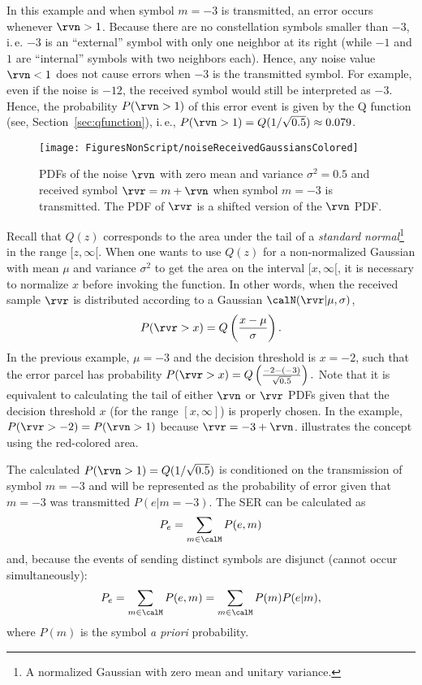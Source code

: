 In this example and when symbol $m=-3$ is transmitted, an error occurs whenever $\rvn > 1$. Because there are no constellation symbols smaller than $-3$, i.\,e. $-3$ is an ``external'' symbol with only one neighbor at its right (while $-1$ and $1$ are ``internal'' symbols with two neighbors each). Hence, any noise value $\rvn < 1$ does not cause errors when $-3$ is the transmitted symbol. For example, even if the noise is $-12$, the received symbol would still be interpreted as $-3$. Hence, the probability $P(\rvn > 1)$ of this error event is given by the Q function (see, Section~\ref{sec:qfunction}), i.\,e., $P(\rvn > 1)=Q(1/\sqrt{0.5})\approx 0.079$. 

\begin{figure}[htbp]
\centering
\texttt{[image: FiguresNonScript/noiseReceivedGaussiansColored]}
\caption[{PDFs of the noise $\rvn$ with zero mean and variance $\sigma^2 = 0.5$ and received symbol $\rvr=m+\rvn$ when symbol $m=-3$ is transmitted.}]{PDFs of the noise $\rvn$ with zero mean and variance $\sigma^2 = 0.5$ and received symbol $\rvr=m+\rvn$ when symbol $m=-3$ is transmitted. The PDF of $\rvr$ is a shifted version of the $\rvn$ PDF. \label{fig:noiseReceivedGaussiansColored}}
\end{figure}

Recall that $Q(z)$ corresponds to the area under the tail of a \emph{standard normal}\footnote{A normalized Gaussian with zero mean and unitary variance.} in the range $[z, \infty[$. When one wants to use $Q(z)$ for a non-normalized Gaussian with mean $\mu$ and variance $\sigma^2$ to get the area on the interval $[x, \infty[$, it is necessary to normalize $x$ before invoking the function. In other words, when the received sample $\rvr$ is distributed according to a Gaussian $\calN(\rvr|\mu,\sigma)$,
\[
P(\rvr > x) = Q\left( \frac{x - \mu}{\sigma}\right).
\]
In the previous example, $\mu=-3$ and the decision threshold is $x=-2$, such that the error parcel has probability $P(\rvr > x) = Q\left( \frac{-2 - (-3)}{\sqrt{0.5}}\right).$ Note that it is equivalent to calculating the tail of either $\rvn$ or $\rvr$ PDFs given that the decision threshold $x$ (for the range $[x,\infty]$) is properly chosen. In the example, $P(\rvr > -2) = P(\rvn > 1)$ because $\rvr = -3 + \rvn$.  illustrates the concept using the red-colored area.

The calculated $P(\rvn > 1)=Q(1/\sqrt{0.5})$ is conditioned on the transmission of symbol $m=-3$ and will be represented as the probability of error given that $m=-3$ was transmitted $P(e|m=-3)$. The SER can be calculated as 
\[
P_e = \sum_{m \in \calM} P(e,m) 
\]
and, because the events of sending distinct symbols are disjunct (cannot occur simultaneously):
\begin{equation}
P_e = \sum_{m \in \calM} P(e,m) = \sum_{m \in \calM} P(m) P(e|m),
\label{eq:pe}
\end{equation}
where $P(m)$ is the symbol \emph{a priori} probability.


